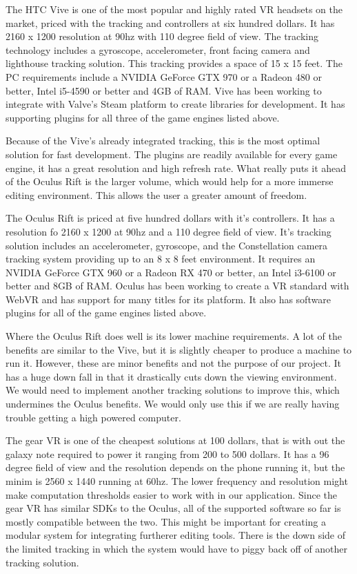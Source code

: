 \documentclass[onecolumn, draftclsnofoot,10pt, compsoc]{IEEEtran}
\newcounter{threesection}[subsubsection]
\begin{document}
The HTC Vive is one of the most popular and highly rated VR headsets on the market, priced with the tracking and controllers at six hundred dollars. It has 2160 x 1200 resolution at 90hz with 110 degree field of view. The tracking technology includes a gyroscope, accelerometer, front facing camera and lighthouse tracking solution. This tracking provides a space of 15 x 15 feet. The PC requirements include a NVIDIA GeForce GTX 970 or a Radeon 480 or better, Intel i5-4590 or better and 4GB of RAM. Vive has been working to integrate with Valve's Steam platform to create libraries for development. It has supporting plugins for all three of the game engines listed above.

Because of the Vive's already integrated tracking, this is the most optimal solution for fast development. The plugins are readily available for every game engine, it has a great resolution and high refresh rate. What really puts it ahead of the Oculus Rift is the larger volume, which would help for a more immerse editing environment. This allows the user a greater amount of freedom.   

The Oculus Rift is priced at five hundred dollars with it's controllers. It has a resolution fo 2160 x 1200 at 90hz and a 110 degree field of view. It's tracking solution includes an accelerometer, gyroscope, and the Constellation camera tracking system providing up to an 8 x 8 feet environment. It requires an NVIDIA GeForce GTX 960 or a Radeon RX 470 or better, an Intel i3-6100 or better and 8GB of RAM. Oculus has been working to create a VR standard with WebVR and has support for many titles for its platform. It also has software plugins for all of the game engines listed above.

Where the Oculus Rift does well is its lower machine requirements. A lot of the benefits are similar to the Vive, but it is slightly cheaper to produce a machine to run it. However, these are minor benefits and not the purpose of our project. It has a huge down fall in that it drastically cuts down the viewing environment. We would need to implement another tracking solutions to improve this, which undermines the Oculus benefits. We would only use this if we are really having trouble getting a high powered computer.

The gear VR is one of the cheapest solutions at 100 dollars, that is with out the galaxy note required to power it ranging from 200 to 500 dollars. It has a 96 degree field of view and the resolution depends on the phone running it, but the minim is 2560 x 1440 running at 60hz. The lower frequency and resolution might make computation thresholds easier to work with in our application. Since the gear VR has similar SDKs to the Oculus, all of the supported software so far is mostly compatible between the two. This might be important for creating a modular system for integrating furtherer editing tools. There is the down side of the limited tracking in which the system would have to piggy back off of another tracking solution.
\end{document}
